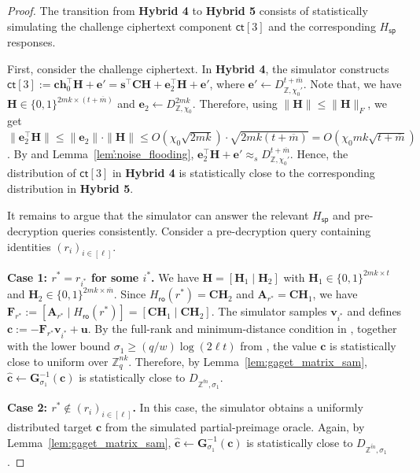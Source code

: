 \begin{proof}
The transition from \textbf{Hybrid 4} to \textbf{Hybrid 5} consists of
statistically simulating the challenge ciphertext component $\mathsf{ct}[3]$
and the corresponding $H_{\mathsf{sp}}$ responses.

First, consider the challenge ciphertext. In \textbf{Hybrid 4}, the simulator
constructs
$\mathsf{ct}[3]
:=
\mathbf{ch}_0^{\top}\mathbf H+\mathbf e'
=
\mathbf s^{\top}\mathbf C\mathbf H
+
\mathbf e_2^{\top}\mathbf H
+
\mathbf e'$,
where
$\mathbf e'\leftarrow D_{\mathbb Z,\chi_0'}^{t+\overline m}$.
Note that, we have
$\mathbf H\in\{0,1\}^{2mk\times(t+\overline m)}$ and 
$\mathbf e_2\leftarrow D_{\mathbb Z,\chi_0}^{2mk}$.
Therefore, using $\|\mathbf H\|\le \|\mathbf H\|_F$, we get
$\|\mathbf e_2^{\top}\mathbf H\|
\le
\|\mathbf e_2\|\cdot\|\mathbf H\|
\le
O(\chi_0\sqrt{2mk})\cdot\sqrt{2mk(t+\overline m)}
=
O(\chi_0mk\sqrt{t+\overline m})$.
By  and Lemma~\ref{lem:̉noise_flooding},
$\mathbf e_2^{\top}\mathbf H+\mathbf e'
\approx_s
D_{\mathbb Z,\chi_0'}^{t+\overline m}$.
Hence, the distribution of $\mathsf{ct}[3]$ in \textbf{Hybrid 4} is
statistically close to the corresponding distribution in \textbf{Hybrid 5}.

It remains to argue that the simulator can answer the relevant
$H_{\mathsf{sp}}$ and pre-decryption queries consistently. Consider a
pre-decryption query containing identities $(r_i)_{i\in[\ell]}$.

\noindent\textbf{Case 1: $r^\ast=r_{i^\ast}$ for some $i^\ast$.}
We have
$\mathbf H=[\mathbf H_1\mid \mathbf H_2]$ with
$\mathbf H_1\in\{0,1\}^{2mk\times t}$ and
$\mathbf H_2\in\{0,1\}^{2mk\times\overline m}$.
Since $H_{\mathsf{ro}}(r^\ast)=\mathbf C\mathbf H_2$ and
$\mathbf A_{r^\ast}=\mathbf C\mathbf H_1$, we have
$\mathbf F_{r^\ast}
:=
[\mathbf A_{r^\ast}\mid H_{\mathsf{ro}}(r^\ast)]
=
[\mathbf C\mathbf H_1\mid \mathbf C\mathbf H_2]$.
The simulator samples $\mathbf v_{i^\ast}$ and defines
$\mathbf c:=-\mathbf F_{r^\ast}\mathbf v_{i^\ast}+\mathbf u$.
By the full-rank and minimum-distance condition in ,
together with the lower bound
$\sigma_1\ge(q/w)\log(2\ell t)$ from ,
the value $\mathbf c$ is statistically close to uniform over
$\mathbb Z_q^{nk}$. Therefore, by Lemma~\ref{lem:gaget_matrix_sam},
$\widehat{\mathbf c}\leftarrow \mathbf G_{\sigma_1}^{-1}(\mathbf c)$
is statistically close to
$D_{\mathbb Z^{\widetilde m},\sigma_1}$.

\noindent\textbf{Case 2: $r^\ast\notin (r_i)_{i\in[\ell]}$.}
In this case, the simulator obtains a uniformly distributed target
$\mathbf c$ from the simulated partial-preimage oracle. Again, by
Lemma~\ref{lem:gaget_matrix_sam},
$\widehat{\mathbf c}\leftarrow \mathbf G_{\sigma_1}^{-1}(\mathbf c)$
is statistically close to
$D_{\mathbb Z^{\widetilde m},\sigma_1}$.


\end{proof}
